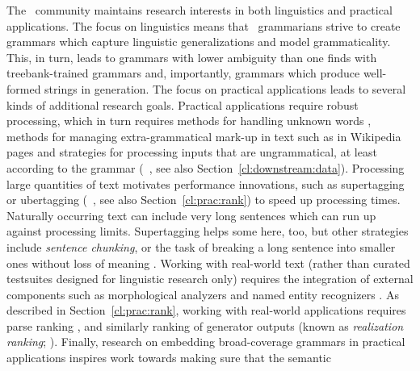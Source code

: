 \documentclass[output=paper,nonflat]{langsci/langscibook}
\begin{document}
The \delphin\ community maintains research interests in both
linguistics and practical applications. The focus on linguistics means
that \delphin\ grammarians strive to create grammars which capture
linguistic generalizations and model grammaticality. This, in turn,
leads to grammars with lower ambiguity than one finds with
treebank-trained grammars and, importantly, grammars which produce
well-formed strings in generation. The focus on practical applications
leads to several kinds of additional research goals. Practical applications
require robust processing, which in turn requires methods for handling 
unknown words
\citep[e.g.,][]{chartmapping}, methods for managing extra-grammatical mark-up in
text such as in Wikipedia pages \citep[e.g.,][]{FOY2010a-u} and strategies
for processing inputs that are ungrammatical, at least according to
the grammar (\eg\ \citealp{W11-2923}, see also Section~\ref{cl:downstream:data}).
Processing large quantities of text motivates performance innovations, such as supertagging or ubertagging (\eg\ \citealp{matsuzaki2007supertag,dridan2013ubertag}, see also Section~\ref{cl:prac:rank}) to speed
up processing times. Naturally occurring text can include very long 
sentences which can run up against processing limits. Supertagging helps some here, too, but other strategies include \textit{sentence chunking}, or the task of breaking a long sentence into smaller ones without loss of meaning \citep{muszynska:2016:ACL-SRW}.
Working with real-world text (rather than curated testsuites designed
for linguistic research only) requires 
the integration of external components such as morphological
analyzers \citep[e.g.,][]{Marimon2013a-u} and named entity recognizers \citep[e.g.,][]{L06-1115,Sch:Usz:Fed:08}. As described in Section~\ref{cl:prac:rank}, working with real-world applications requires parse ranking \citep[e.g.,][]{Tou:Man:Fli:Oep:05}, and similarly ranking of generator outputs (known as \textit{realization ranking}; \citealt[e.g.,][]{Velldal:09}). Finally, research on embedding broad-coverage grammars in practical applications inspires work  towards making sure that the semantic
\end{document}
